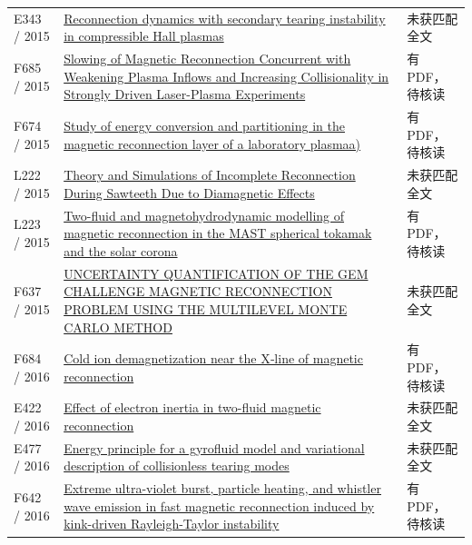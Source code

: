 \begin{longtable}{P{24mm}P{97mm}P{27mm}}
E343 / 2015 & \href{https://doi.org/10.1063/1.4922057}{Reconnection dynamics with secondary tearing instability in compressible Hall plasmas} & 未获匹配全文\\

F685 / 2015 & \href{https://doi.org/10.1103/physrevlett.114.205004}{Slowing of Magnetic Reconnection Concurrent with Weakening Plasma Inflows and Increasing Collisionality in Strongly Driven Laser-Plasma Experiments} & 有PDF，待核读\\

F674 / 2015 & \href{https://doi.org/10.1063/1.4920960}{Study of energy conversion and partitioning in the magnetic reconnection layer of a laboratory plasmaa)} & 有PDF，待核读\\

L222 / 2015 & \href{https://doi.org/10.33915/etd.5178}{Theory and Simulations of Incomplete Reconnection During Sawteeth Due to Diamagnetic Effects} & 未获匹配全文\\

L223 / 2015 & \href{https://doi.org/10.1088/0741-3335/58/1/014041}{Two-fluid and magnetohydrodynamic modelling of magnetic reconnection in the MAST spherical tokamak and the solar corona} & 有PDF，待核读\\

F637 / 2015 & \href{https://doi.org/10.1615/int.j.uncertaintyquantification.2015006492}{UNCERTAINTY QUANTIFICATION OF THE GEM CHALLENGE MAGNETIC RECONNECTION PROBLEM USING THE MULTILEVEL MONTE CARLO METHOD} & 未获匹配全文\\

F684 / 2016 & \href{https://doi.org/10.1002/2016gl069877}{Cold ion demagnetization near the X‐line of magnetic reconnection} & 有PDF，待核读\\

E422 / 2016 & \href{http://ui.adsabs.harvard.edu/abs/2016cosp...41E.697G/abstract}{Effect of electron inertia in two-fluid magnetic reconnection} & 未获匹配全文\\

E477 / 2016 & \href{http://absimage.aps.org/image/DPP16/MWS_DPP16-2016-000949.pdf}{Energy principle for a gyrofluid model and variational description of collisionless tearing modes} & 未获匹配全文\\

F642 / 2016 & \href{https://doi.org/10.1063/1.4944390}{Extreme ultra-violet burst,  particle heating,  and whistler wave emission in fast magnetic reconnection induced by kink-driven Rayleigh-Taylor instability} & 有PDF，待核读\\


\end{longtable}
